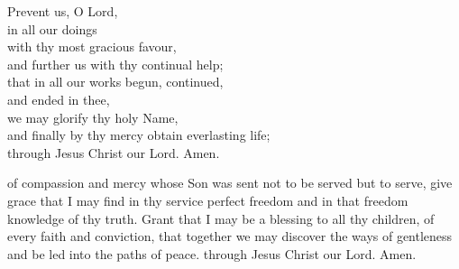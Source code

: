 {\vfill 

\begin{center}
	
Prevent us, O Lord,\\ in all our doings \\with thy most gracious favour, \\and
further us with thy continual help;\\ that in all our works begun, continued,\\
and ended in thee,\\ we may glorify thy holy Name, \\and finally by thy mercy
obtain everlasting life; \\through Jesus Christ our Lord.
Amen.
\end{center}

\vfill 


 of compassion and mercy
whose Son was sent not to be served but to serve,
give grace that I may find in thy service perfect freedom
and in that freedom knowledge of thy truth.
Grant that I may be a blessing to all thy children, of every faith and conviction,
that together we may discover the ways of gentleness
and be led into the paths of peace.
through Jesus Christ our Lord.
Amen.
\vfill 
\clearpage

\mbox{}


}
